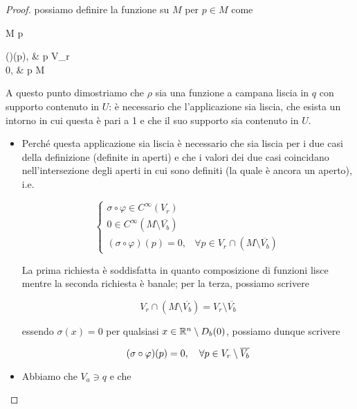 \begin{proof}
	possiamo definire la funzione su $ M $ per $ p \in M $ come
	
	\map{\rho}
		{M}{\R}
		{p}{%
			\begin{cases}
				(\sigma \circ \varphi)(p), & p \in V_{r} \\
				0, & p \in M \setminus {}
			\end{cases}
			}

	A questo punto dimostriamo che $ \rho $ sia una funzione a campana liscia in $ q $ con supporto contenuto in $ U $: è necessario che l'applicazione sia liscia, che esista un intorno in cui questa è pari a 1 e che il suo supporto sia contenuto in $ U $.
	
	\begin{itemize}
		\item Perché questa applicazione sia liscia è necessario che sia liscia per i due casi della definizione (definite in aperti) e che i valori dei due casi coincidano nell'intersezione degli aperti in cui sono definiti (la quale è ancora un aperto), i.e.
		
		\begin{equation}
			\begin{cases}
				\sigma \circ \varphi \in C^{\infty}(V_{r}) \\
				0 \in C^{\infty} \left( M \setminus \overline{V_{b}} \right) \\
				(\sigma \circ \varphi)(p) = 0, & \forall p \in V_{r} \cap (M \setminus \overline{V_{b}})
			\end{cases}
		\end{equation}
		
		La prima richiesta è soddisfatta in quanto composizione di funzioni lisce mentre la seconda richiesta è banale; per la terza, possiamo scrivere
		
		\begin{equation}
			V_{r} \cap \left( M \setminus \overline{V_{b}} \right) = V_{r} \setminus \overline{V_{b}}
		\end{equation}
		
		essendo $ \sigma(x) = 0 $ per qualsiasi $ x \in \mathbb{R}^{n} \setminus D_{b}(0) $, possiamo dunque scrivere
		
		\begin{equation}
			(\sigma \circ \varphi)(p) = 0 \qcomma \forall p \in V_{r} \setminus \overline{V_{b}}
		\end{equation}
		
		
		\item Abbiamo che $ V_{a} \ni q $ e che
		

\end{itemize}
\end{proof}
